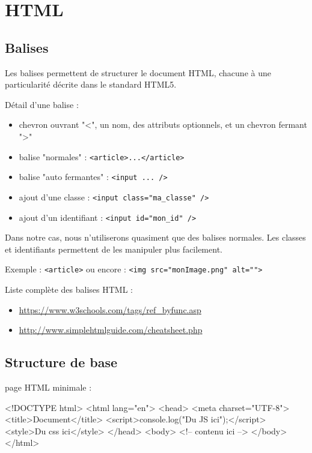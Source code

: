 \documentclass[10pt, french]{article}
\newcommand{\codeHTMLinline}[2] {
	#1 : \texttt{#2}
  }
\newenvironment{codeHTML}[1]{%
#1 :  %
\minted{HTML}%
}{%
\endminted%
}
\begin{document}
		\section{HTML}

\subsection{Balises}

Les balises permettent de structurer le document HTML, chacune à une particularité décrite dans le standard HTML5. 

Détail d'une balise :
\begin{itemize}
\item chevron ouvrant "<", un nom, des attributs optionnels, et un chevron fermant ">"
\item balise \codeHTMLinline{"normales"}{<article>...</article>}
\item balise \codeHTMLinline{"auto fermantes"}{<input ... />}
\item \codeHTMLinline{ajout d'une classe}{<input class="ma_classe" />}
\item \codeHTMLinline{ajout d'un identifiant}{<input id="mon_id" />}
\end{itemize}

Dans notre cas, nous n'utiliserons quasiment que des balises normales. Les classes et identifiants permettent de les manipuler plus facilement. 

\codeHTMLinline{Exemple}{<article>} ou \codeHTMLinline{encore}{<img src="monImage.png" alt="">}


Liste complète des balises HTML :
\begin{itemize}
	\item \url{https://www.w3schools.com/tags/ref_byfunc.asp}
	\item \url{http://www.simplehtmlguide.com/cheatsheet.php}
\end{itemize}

\subsection{Structure de base}
\begin{codeHTML}{page HTML minimale}
<!DOCTYPE html>
<html lang="en">
<head>
	<meta charset="UTF-8">
	<title>Document</title>
	<script>console.log("Du JS ici");</script>
	<style>Du css ici</style>
</head>
<body>
	<!-- contenu ici -->
</body>
</html>
\end{codeHTML}
\end{document}
